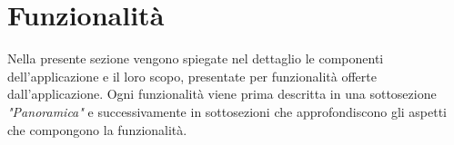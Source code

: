 \documentclass[../ManualeSviluppatore.tex]{subfiles}
\begin{document}
\section{Funzionalità}
	Nella presente sezione vengono spiegate nel dettaglio le componenti dell'applicazione e il loro scopo, presentate per funzionalità offerte dall'applicazione.
	Ogni funzionalità viene prima descritta in una sottosezione \textit{"Panoramica"} e successivamente in sottosezioni che approfondiscono gli aspetti che compongono la funzionalità.
	
	
	
	
	
	
	
	
	
	
\end{document}
